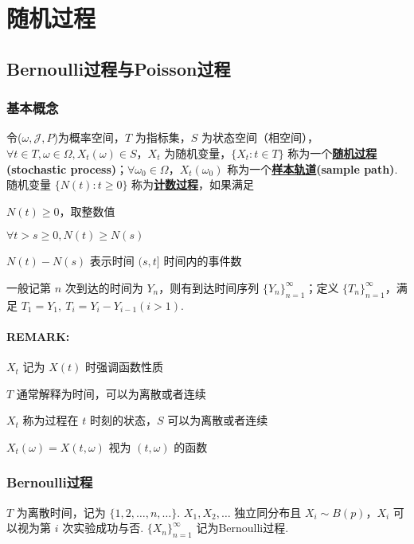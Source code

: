 \documentclass[./main.tex]{subfiles}
\begin{document}
\chapter{随机过程}
\section{Bernoulli过程与Poisson过程}
\subsection{基本概念}
令($\omega,\mathscr{J},P$)为概率空间，$T$ 为指标集，$S$ 为状态空间（相空间），$\forall t\in T, \omega\in\Omega,X_t(\omega)\in S$，$X_t$ 为随机变量，$\{X_t:t\in T\}$ 称为一个\underline{\textbf{随机过程}}\textbf{(stochastic process)}；$\forall \omega_0\in\Omega$，$X_t(\omega_0)$ 称为一个\underline{\textbf{样本轨道}}\textbf{(sample path)}. \\
随机变量 $\{N(t):t\ge 0\}$ 称为\underline{\textbf{计数过程}}，如果满足
\begin{enumerate*}
    \item $N(t)\ge 0$，取整数值
    \item $\forall t>s\ge 0,N(t)\ge N(s)$
    \item $N(t)-N(s)$ 表示时间 $(s,t]$ 时间内的事件数
\end{enumerate*}

一般记第 $n$ 次到达的时间为 $Y_n$，则有到达时间序列 $\{Y_n\}_{n=1}^{\infty}$；定义 $\{T_n\}_{n=1}^{\infty}$，满足 $T_1=Y_1,\ T_i=Y_i-Y_{i-1}(i>1)$. 
\subsubsection{REMARK:}
\begin{enumerate*}
    \item $X_t$ 记为 $X(t)$ 时强调函数性质
    \item $T$ 通常解释为时间，可以为离散或者连续
    \item $X_t$ 称为过程在 $t$ 时刻的状态，$S$ 可以为离散或者连续
    \item $X_t(\omega)=X(t,\omega)$ 视为 $(t,\omega)$ 的函数
\end{enumerate*}
\subsection{Bernoulli过程}
$T$ 为离散时间，记为 $\{1,2,\dots,n,\dots\}$. $X_1,X_2,\dots$ 独立同分布且 $X_i\sim B(p)$，$X_i$ 可以视为第 $i$ 次实验成功与否. $\{X_n\}_{n=1}^{\infty}$ 记为Bernoulli过程. 
\end{document}
